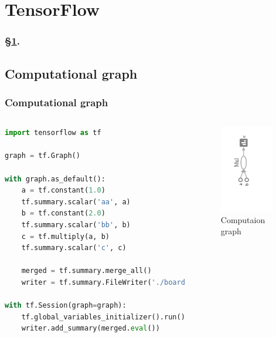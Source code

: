 
\section{TensorFlow}\label{sec:TF}


\frameinlbffalse

\begin{frame}[plain]
\frametitle{\S\ref{sec:TF}. \insertsection}
\listofframes
\end{frame}
\addtocounter{framenumber}{-1} %

\frameinlbftrue

\subsection{Computational graph}

\begin{frame}[fragile]
  \MyLogo
  \frametitle{Computational graph}  
%  
\begin{columns}
\tiny{
\begin{lstlisting}[language=python]
import tensorflow as tf

graph = tf.Graph()

with graph.as_default():
	a = tf.constant(1.0)
	tf.summary.scalar('aa', a)
	b = tf.constant(2.0)
	tf.summary.scalar('bb', b)
	c = tf.multiply(a, b)
	tf.summary.scalar('c', c)
	
	merged = tf.summary.merge_all()
	writer = tf.summary.FileWriter('./board', graph)

with tf.Session(graph=graph):
	tf.global_variables_initializer().run()
	writer.add_summary(merged.eval())
	
\end{lstlisting}
}
%
%
\begin{figure}[htbp] 
   \includegraphics[height=1.5in]{figures/compgraph.png} 
\caption{Computaion graph}
\end{figure}
\end{columns}
\end{frame}

